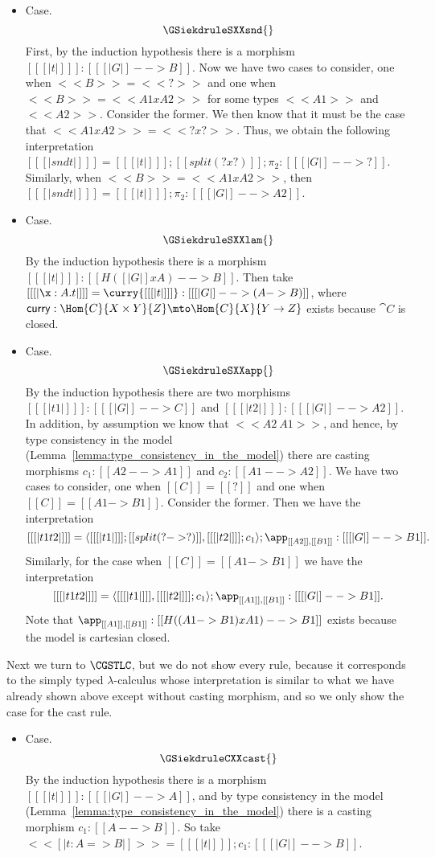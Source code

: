 \begin{itemize}
  \item[] Case.
    \[
    \GSiekdruleSXXsnd{}
    \]
    First, by the induction hypothesis there is a morphism $[[ [| t |] ]] : [[ [| G |] --> B]]$.
    Now we have two cases to consider, one when $<<B>> = <<?>>$ and one when $<<B>> = <<A1 x A2>>$
    for some types $<<A1>>$ and $<<A2>>$.  Consider the former.  We then know that it must
    be the case that $<<A1 x A2>> = <<? x ?>>$.  Thus, we obtain the following interpretation
    $[[ [| snd t |] ]] = [[ [| t |] ]];[[split (? x ?)]];\pi_2 : [[ [| G |] --> ?]]$.  Similarly,
    when $<<B>> = <<A1 x A2>>$, then
    $[[ [| snd t |] ]] = [[ [| t |] ]];\pi_2 : [[ [| G |] --> A2]]$.

  \item[] Case.
    \[
    \GSiekdruleSXXlam{}
    \] 
    By the induction hypothesis there is a morphism $[[ [| t |] ]] :
    [[ H([| G |] x A) --> B]]$.  Then take $[[ [| \x : A.t |] ]] =
    \curry {[[ [| t |] ]]} : [[ [| G |] --> (A -> B)]]$, where
    $\mathsf{curry} : \Hom{C}{X \times Y}{Z} \mto \Hom{C}{X}{Y \to Z}$
    exists because $\cat{C}$ is closed.

  \item[] Case.
    \[
    \GSiekdruleSXXapp{}
    \]
    By the induction hypothesis there are two morphisms
    $[[ [| t1 |] ]] : [[ [| G |] --> C ]]$ and
    $[[ [| t2 |] ]] : [[ [| G |] --> A2 ]]$.  In addition, by assumption we know that
    $<<A2 ~ A1>>$, and hence, by type consistency in the model (Lemma~\ref{lemma:type_consistency_in_the_model})
     there are casting morphisms $c_1 : [[A2 --> A1]]$ and $c_2 : [[A1 --> A2]]$.  We have two cases to consider,
    one when $[[C]] = [[?]]$ and one when $[[C]] = [[A1 -> B1]]$.  Consider
    the former. Then we have the interpretation
    \[ [[ [| t1 t2 |] ]] = \langle [[ [| t1 |] ]];[[split (? -> ?)]], [[ [| t2 |] ]];c_1 \rangle;\app_{[[A2]],[[B1]]} : [[ [| G |] --> B1 ]]. \]
    Similarly, for the case when $[[C]] = [[A1 -> B1]]$ we have the interpretation
    \[ [[ [| t1 t2 |] ]] = \langle [[ [| t1 |] ]], [[ [| t2 |] ]];c_1 \rangle;\app_{[[A1]],[[B1]]} : [[ [| G |] --> B1 ]]. \]
    Note that $\app_{[[A1]],[[B1]]} : [[ H((A1 -> B1) x A1) --> B1]]$ exists because the
    model is cartesian closed.
  \end{itemize}

  Next we turn to $\CGSTLC$, but we do
not show every rule, because it corresponds to the simply typed
$\lambda$-calculus whose interpretation is similar to what we have
already shown above except without casting morphism, and so we only
show the case for the cast rule.
\begin{itemize}
\item[] Case.
  \[
  \GSiekdruleCXXcast{}
  \]
  By the induction hypothesis there is a morphism $[[ [| t |] ]] : [[ [| G |] --> A]]$,
  and by type consistency in the model (Lemma~\ref{lemma:type_consistency_in_the_model})
  there is a casting morphism $c_1 : [[A --> B]]$.  So take
  $ << [| t : {A} => {B} |] >> = [[ [| t |] ]];c_1 : [[ [| G |] --> B ]]$.
\end{itemize}

